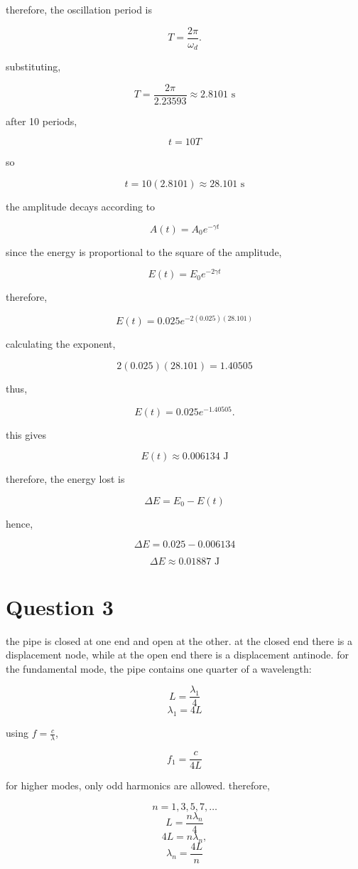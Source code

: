 \documentclass{article}
\begin{document}
therefore, the oscillation period is

\[
T=\frac{2\pi}{\omega_d}.
\]

substituting,

\[
T=\frac{2\pi}{2.23593}\approx2.8101\text{ s}
\]

after 10 periods,

\[
t=10T
\]

so

\[
t=10(2.8101)\approx28.101\text{ s}
\]

the amplitude decays according to

\[
A(t)=A_0e^{-\gamma t}
\]

since the energy is proportional to the square of the amplitude,

\[
E(t)=E_0e^{-2\gamma t}
\]

therefore,

\[
E(t)=0.025e^{-2(0.025)(28.101)}
\]

calculating the exponent,

\[
2(0.025)(28.101)=1.40505
\]

thus,

\[
E(t)=0.025e^{-1.40505}.
\]

this gives

\[
E(t)\approx0.006134\text{ J}
\]

therefore, the energy lost is

\[
\Delta E=E_0-E(t)
\]

hence,

\[
\Delta E=0.025-0.006134
\]

\[
\boxed{\Delta E\approx0.01887\text{ J}}
\]

\section{Question 3}

the pipe is closed at one end and open at the other. at the closed end there is a displacement node, 
while at the open end there is a displacement antinode. for the fundamental mode, the pipe contains one quarter of a wavelength:

\[
L=\frac{\lambda_1}{4}
\]
\[
\lambda_1=4L
\]

using $f=\frac{c}{\lambda}$,

\[
f_1=\frac{c}{4L}
\]

for higher modes, only odd harmonics are allowed. therefore,

\[
n=1,3,5,7,\ldots
\]
\[
L=\frac{n\lambda_n}{4}
\]
\[
4L=n\lambda_n,
\]
\[
\lambda_n=\frac{4L}{n}
\]
\end{document}
